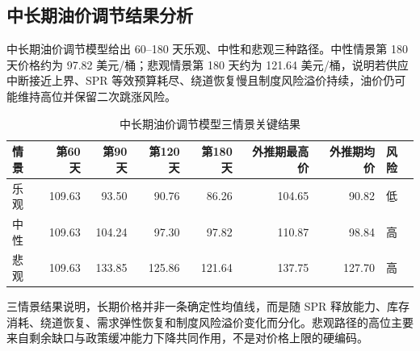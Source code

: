 \subsection{中长期油价调节结果分析}

中长期油价调节模型给出 60--180 天乐观、中性和悲观三种路径。中性情景第 180 天价格约为 97.82 美元/桶；悲观情景第 180 天约为 121.64 美元/桶，说明若供应中断接近上界、SPR 等效预算耗尽、绕道恢复慢且制度风险溢价持续，油价仍可能维持高位并保留二次跳涨风险。

\begin{table}[!htbp]
\centering
\caption{中长期油价调节模型三情景关键结果}
\begin{tabular}{lrrrrrrl}
\toprule
情景 & 第60天 & 第90天 & 第120天 & 第180天 & 外推期最高价 & 外推期均价 & 风险 \\
\midrule
乐观 & 109.63 & 93.50 & 90.76 & 86.26 & 104.65 & 90.82 & 低 \\
中性 & 109.63 & 104.24 & 97.30 & 97.82 & 110.87 & 98.84 & 高 \\
悲观 & 109.63 & 133.85 & 125.86 & 121.64 & 137.75 & 127.70 & 高 \\
\bottomrule
\end{tabular}
\end{table}

三情景结果说明，长期价格并非一条确定性均值线，而是随 SPR 释放能力、库存消耗、绕道恢复、需求弹性恢复和制度风险溢价变化而分化。悲观路径的高位主要来自剩余缺口与政策缓冲能力下降共同作用，不是对价格上限的硬编码。
